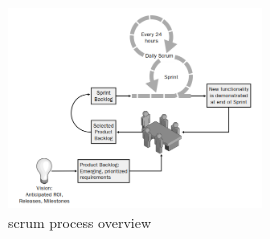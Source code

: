 \begin{figure}[H]
  \centering
  \includegraphics[width=0.6\textwidth]{./figures/chapter_1/scrum_process_overview.PNG}
  \caption{scrum process overview}
  \label{fig:ch1-scrum_process_overview}
\end{figure}\bigskip
